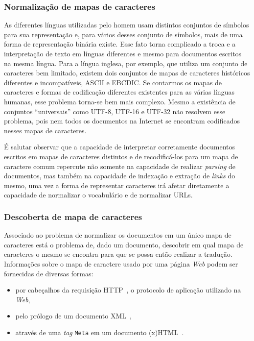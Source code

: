 \documentclass[10pt,twocolumn]{article}
\begin{document}
\subsubsection{Normalização de mapas de
caracteres}\label{prob:charmapnorm}

As diferentes línguas utilizadas pelo homem usam distintos conjuntos de
símbolos para sua representação e, para vários desses conjunto de
símbolos, mais de uma forma de representação binária existe. Esse fato
torna complicado a troca e a interpretação de texto em línguas diferentes
e mesmo para documentos escritos na mesma língua. Para a língua inglesa,
por exemplo, que utiliza um conjunto de caracteres bem limitado, existem
dois conjuntos de mapas de caracteres históricos diferentes e
incompatíveis, ASCII e EBCDIC. Se contarmos os mapas de caracteres e
formas de codificação diferentes existentes para as várias línguas
humanas, esse problema torna-se bem mais complexo.
Mesmo a existência de conjuntos ``universais'' como UTF-8, UTF-16 e
UTF-32 não resolvem esse problema, pois nem todos os documentos na
Internet se encontram codificados nesses mapas de caracteres.

É salutar observar que a capacidade de interpretar corretamente
documentos escritos em mapas de caracteres distintos e de recodificá-los
para um mapa de caractere comum  repercute não somente na capacidade de
realizar \emph{parsing} de documentos, mas também na capacidade de
indexação e extração de \emph{links} do mesmo, uma vez a forma de
representar caracteres irá afetar diretamente a capacidade de
normalizar o vocabulário e de normalizar URLs.

\subsubsection{Descoberta de mapa de
caracteres}\label{prob:charmapdetection}

Associado ao problema de normalizar os documentos em um único mapa de
caracteres está o problema de, dado um documento, descobrir em qual mapa
de caracteres o mesmo se encontra para que se possa então realizar a
tradução. Informações sobre o mapa de caractere usado por uma página
\emph{Web} podem ser fornecidas de diversas formas:
\begin{itemize}
\item por cabeçalhos da requisição HTTP~\cite{rfc2616},
 o protocolo de aplicação utilizado na \emph{Web},
\item pelo prólogo de um documento XML~\cite{bray2006xml},
\item através de uma \emph{tag} \texttt{Meta} em um documento
(x)HTML~\cite{html4tr}.
\end{itemize}
\end{document}
